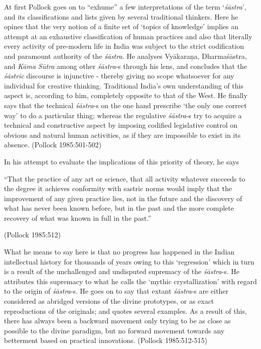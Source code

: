 At first Pollock goes on to ``exhume'' a few interpretations of the term `{\it śāstra}', and its classifications and lists given by several traditional thinkers. Here he opines that the very notion of a finite set of `topics of knowledge' implies an attempt at an exhaustive classification of human practices and also that literally every activity of pre-modern life in India was subject to the strict codification and paramount authority of the {\it śāstra}. He analyses Vyākaraṇa, Dharmaśāstra, and {\sl Kāma Sūtra} among other {\it śāstra}-s through his lens, and concludes that the {\sl śāstric} discourse is injunctive - thereby giving no scope whatsoever for any individual for creative thinking. Traditional India's own understanding of this aspect is, according to him, completely opposite to that of the West. He finally says that the technical {\it śāstra}-s on the one hand prescribe `the only one correct way' to do a particular thing;  whereas the regulative {\it śāstra}-s try to acquire a technical and constructive aspect by imposing codified legislative control on obvious and natural human activities, as if they are impossible to exist in its absence. (Pollock 1985:501-502)

In his attempt to evaluate the implications of this priority of theory, he says
\begin{myquote}
``That the practice of any art or science, that all activity whatever succeeds to the degree it achieves conformity with sastric norms would imply that the improvement of any given practice lies, not in the future and the discovery of what has never been known before, but in the past and the more complete recovery of what was known in full in the past.'' 

\hfill (Pollock 1985:512)
\end{myquote}

What he means to say here is that no progress has happened in the Indian intellectual history for thousands of years owing to this `regression' which in turn is a result of the unchallenged and undisputed supremacy of the {\it śāstra}-s. He attributes this supremacy to what he calls the `mythic crystallization' with regard to the origin of {\it śāstra}-s. He goes on to say that extant {\it śāstra}-s are either considered as abridged versions of the divine prototypes, or as exact reproductions of the originals; and quotes several examples. As a result of this, there has always been a backward movement only trying to be as close as possible to the divine paradigm, but no forward movement towards any betterment based on practical innovations. (Pollock 1985:512-515)

